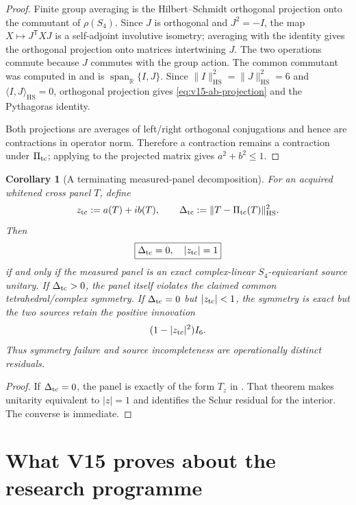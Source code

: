 \documentclass[11pt]{article}
\newtheorem{corollary}[corollary]{Corollary}
\theoremstyle{definition}
\theoremstyle{remark}
\newcommand{\R}{\mathbb R}
\newcommand{\HS}{\mathrm{HS}}
\begin{document}
\begin{proof}
Finite group averaging is the Hilbert--Schmidt orthogonal projection onto the
commutant of $\rho(S_4)$.  Since $J$ is orthogonal and $J^2=-I$, the map
$X\mapsto J^{\mathsf T}XJ$ is a self-adjoint involutive isometry; averaging
with the identity gives the orthogonal projection onto matrices intertwining
$J$.  The two operations commute because $J$ commutes with the group action.
The common commutant was computed in  and is
$\operatorname{span}_{\R}\{I,J\}$.  Since
$\|I\|_{\HS}^2=\|J\|_{\HS}^2=6$ and
$\langle I,J\rangle_{\HS}=0$, orthogonal projection gives
\eqref{eq:v15-ab-projection} and the Pythagoras identity.

Both projections are averages of left/right orthogonal conjugations and hence
are contractions in operator norm.  Therefore a contraction remains a
contraction under $\Pi_{\rm tc}$; applying
 to the projected matrix gives
$a^2+b^2\le1$.
\end{proof}

\begin{corollary}[A terminating measured-panel decomposition]
\label{cor:v15-measured-decomposition}
For an acquired whitened cross panel $T$, define
\[
 z_{\rm tc}:=a(T)+ib(T),
 \qquad
 \Delta_{\rm tc}:=\|T-\Pi_{\rm tc}(T)\|_{\HS}^2.
\]
Then
\[
 \boxed{
 \Delta_{\rm tc}=0,\quad |z_{\rm tc}|=1}
\]
if and only if the measured panel is an exact complex-linear $S_4$-equivariant
source unitary.  If $\Delta_{\rm tc}>0$, the panel itself violates the claimed
common tetrahedral/complex symmetry.  If $\Delta_{\rm tc}=0$ but
$|z_{\rm tc}|<1$, the symmetry is exact but the two sources retain the positive
innovation
\[
 (1-|z_{\rm tc}|^2)I_6.
\]
Thus symmetry failure and source incompleteness are operationally distinct
residuals.
\end{corollary}

\begin{proof}
If $\Delta_{\rm tc}=0$, the panel is exactly of the form $T_z$ in
.  That theorem makes unitarity equivalent to $|z|=1$ and
identifies the Schur residual for the interior.  The converse is immediate.
\end{proof}

\section{What V15 proves about the research programme}
\label{sec:v15-status}
\end{document}
